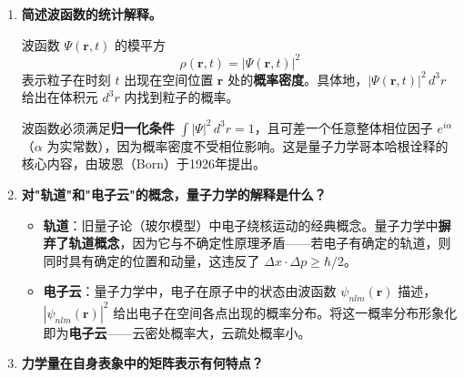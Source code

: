 \begin{enumerate}[label=\textbf{\arabic*.}, leftmargin=2em, itemsep=0.8em]
\begin{itemize}[nosep]
    \item \textbf{塞曼效应（Zeeman Effect）}：原子在外\textbf{磁场}中，由于磁矩与磁场的相互作用，能级发生分裂，导致光谱线分裂的现象。
    \begin{itemize}[nosep]
        \item \textbf{正常塞曼效应}：仅考虑轨道磁矩，自旋为零时，能级分裂为三条，分裂间距为 $\Delta E = \mu_B B$；
        \item \textbf{反常塞曼效应}：考虑电子自旋，分裂条数和间距更复杂，由朗德 $g$ 因子决定。
    \end{itemize}
    \item \textbf{斯达克效应（Stark Effect）}：原子在外\textbf{电场}中，能级发生分裂或位移的现象。氢原子的 $n=2$ 能级在电场中发生一级（线性）分裂，而基态 $n=1$ 只有二级（二次）斯达克效应。
\end{itemize}

\item \textbf{简述波函数的统计解释。}

波函数 $\Psi(\mathbf{r},t)$ 的模平方
\[
    \rho(\mathbf{r},t) = |\Psi(\mathbf{r},t)|^2
\]
表示粒子在时刻 $t$ 出现在空间位置 $\mathbf{r}$ 处的\textbf{概率密度}。具体地，$|\Psi(\mathbf{r},t)|^2\,d^3r$ 给出在体积元 $d^3r$ 内找到粒子的概率。

波函数必须满足\textbf{归一化条件} $\int|\Psi|^2\,d^3r = 1$，且可差一个任意整体相位因子 $e^{i\alpha}$（$\alpha$ 为实常数），因为概率密度不受相位影响。这是量子力学哥本哈根诠释的核心内容，由玻恩（Born）于1926年提出。

\item \textbf{对"轨道"和"电子云"的概念，量子力学的解释是什么？}

\begin{itemize}[nosep]
    \item \textbf{轨道}：旧量子论（玻尔模型）中电子绕核运动的经典概念。量子力学中\textbf{摒弃了轨道概念}，因为它与不确定性原理矛盾——若电子有确定的轨道，则同时具有确定的位置和动量，这违反了 $\Delta x\cdot\Delta p\ge \hbar/2$。
    \item \textbf{电子云}：量子力学中，电子在原子中的状态由波函数 $\psi_{nlm}(\mathbf{r})$ 描述，$|\psi_{nlm}(\mathbf{r})|^2$ 给出电子在空间各点出现的概率分布。将这一概率分布形象化即为\textbf{电子云}——云密处概率大，云疏处概率小。
\end{itemize}

\item \textbf{力学量在自身表象中的矩阵表示有何特点？}


\end{enumerate}
